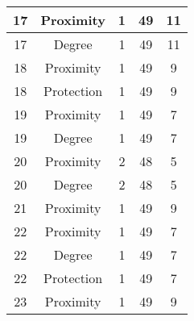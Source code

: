 \documentclass[results.tex]{subfiles}
\begin{document}
\begin{center}
\begin{tabular}{| c || c | c | c | c |}
            \hline
            17                      & Proximity                    & 1                      & 49                      & 11                   \\
            \hline
            17                      & Degree                       & 1                      & 49                      & 11                   \\
            \hline
            18                      & Proximity                    & 1                      & 49                      & 9                    \\
            \hline
            18                      & Protection                   & 1                      & 49                      & 9                    \\
            \hline
            19                      & Proximity                    & 1                      & 49                      & 7                    \\
            \hline
            19                      & Degree                       & 1                      & 49                      & 7                    \\
            \hline
            20                      & Proximity                    & 2                      & 48                      & 5                    \\
            \hline
            20                      & Degree                       & 2                      & 48                      & 5                    \\
            \hline
            21                      & Proximity                    & 1                      & 49                      & 9                    \\
            \hline
            22                      & Proximity                    & 1                      & 49                      & 7                    \\
            \hline
            22                      & Degree                       & 1                      & 49                      & 7                    \\
            \hline
            22                      & Protection                   & 1                      & 49                      & 7                    \\
            \hline
            23                      & Proximity                    & 1                      & 49                      & 9                    \\

\end{tabular}
\end{center}
\end{document}
